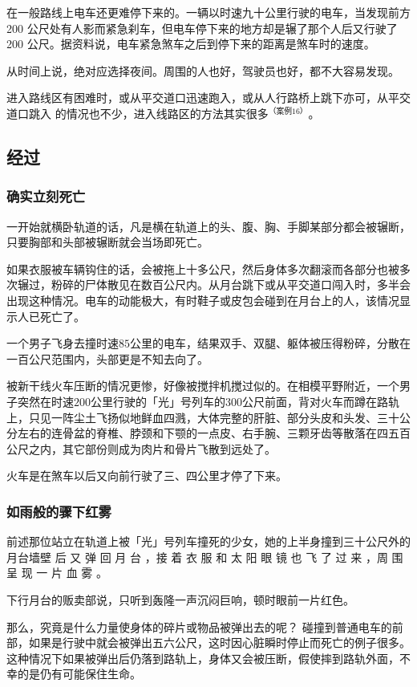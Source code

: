 \documentclass[UTF8]{ctexart}
\begin{document}
在一般路线上电车还更难停下来的。一辆以时速九十公里行驶的电车，当发现前方 200 公尺处有人影而紧急刹车，但电车停下来的地方却是辗了那个人后又行驶了 200 公尺。据资料说，电车紧急煞车之后到停下来的距离是煞车时的速度。

从时间上说，绝对应选择夜间。周围的人也好，驾驶员也好，都不大容易发现。 

进入路线区有困难时，或从平交道口迅速跑入，或从人行路桥上跳下亦可，从平交道口跳入 的情况也不少，进入线路区的方法其实很多$^{（案例 16）}$。

\subsection{经过}

\subsubsection*{确实立刻死亡}

一开始就横卧轨道的话，凡是横在轨道上的头、腹、胸、手脚某部分都会被辗断，只要胸部和头部被辗断就会当场即死亡。

如果衣服被车辆钩住的话，会被拖上十多公尺，然后身体多次翻滚而各部分也被多次辗过，粉碎的尸体散见在数百公尺内。从月台跳下或从平交道口闯入时，多半会出现这种情况。电车的动能极大，有时鞋子或皮包会碰到在月台上的人，该情况显示人已死亡了。

一个男子飞身去撞时速$85$公里的电车，结果双手、双腿、躯体被压得粉碎，分散在一百公尺范围内，头部更是不知去向了。

被新干线火车压断的情况更惨，好像被搅拌机搅过似的。在相模平野附近，一个男子突然在时速$200$公里行驶的「光」号列车的$300$公尺前面，背对火车而蹲在路轨上，只见一阵尘土飞扬似地鲜血四溅，大体完整的肝脏、部分头皮和头发、三十公分左右的连骨盆的脊椎、脖颈和下颚的一点皮、右手腕、三颗牙齿等散落在四五百公尺之内，其它部份则成为肉片和骨片飞散到远处了。

火车是在煞车以后又向前行驶了三、四公里才停了下来。 

\subsubsection*{如雨般的骤下红雾}

前述那位站立在轨道上被「光」号列车撞死的少女，她的上半身撞到三十公尺外的月台墙壁 后 又 弹 回 月 台 ，接 着 衣 服 和 太 阳 眼 镜 也 飞 了 过 来 ，周 围 呈 现 一 片 血 雾 。

下行月台的贩卖部说，只听到轰隆一声沉闷巨响，顿时眼前一片红色。

那么，究竟是什么力量使身体的碎片或物品被弹出去的呢？ 碰撞到普通电车的前部，如果是行驶中就会被弹出五六公尺，这时因心脏瞬时停止而死亡的例子很多。
这种情况下如果被弹出后仍落到路轨上，身体又会被压断，假使摔到路轨外面，不幸的是仍有可能保住生命。
\end{document}
